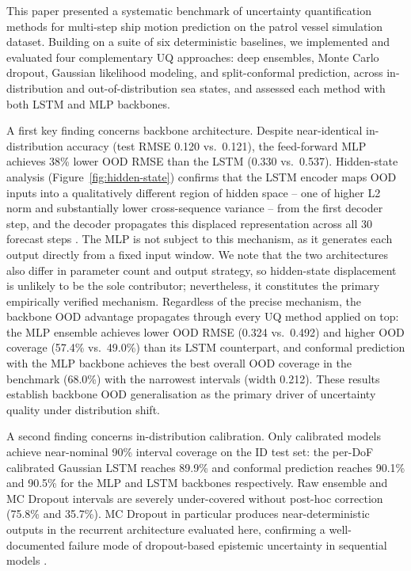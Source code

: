 \documentclass[a4paper,fleqn]{cas-sc}
\begin{document}
This paper presented a systematic benchmark of uncertainty quantification methods for multi-step ship motion prediction on the patrol vessel simulation dataset. Building on a suite of six deterministic baselines, we implemented and evaluated four complementary UQ approaches: deep ensembles, Monte Carlo dropout, Gaussian likelihood modeling, and split-conformal prediction, across in-distribution and out-of-distribution sea states, and assessed each method with both LSTM and MLP backbones.

A first key finding concerns backbone architecture. Despite near-identical in-distribution accuracy (test RMSE 0.120 vs.\ 0.121), the feed-forward MLP achieves 38\% lower OOD RMSE than the LSTM (0.330 vs.\ 0.537). Hidden-state analysis (Figure~\ref{fig:hidden-state}) confirms that the LSTM encoder maps OOD inputs into a qualitatively different region of hidden space -- one of higher L2 norm and substantially lower cross-sequence variance -- from the first decoder step, and the decoder propagates this displaced representation across all 30 forecast steps \cite{quinonero2008dataset}. The MLP is not subject to this mechanism, as it generates each output directly from a fixed input window. We note that the two architectures also differ in parameter count and output strategy, so hidden-state displacement is unlikely to be the sole contributor; nevertheless, it constitutes the primary empirically verified mechanism. Regardless of the precise mechanism, the backbone OOD advantage propagates through every UQ method applied on top: the MLP ensemble achieves lower OOD RMSE (0.324 vs.\ 0.492) and higher OOD coverage (57.4\% vs.\ 49.0\%) than its LSTM counterpart, and conformal prediction with the MLP backbone achieves the best overall OOD coverage in the benchmark (68.0\%) with the narrowest intervals (width 0.212). These results establish backbone OOD generalisation as the primary driver of uncertainty quality under distribution shift.

A second finding concerns in-distribution calibration. Only calibrated models achieve near-nominal 90\% interval coverage on the ID test set: the per-DoF calibrated Gaussian LSTM reaches 89.9\% and conformal prediction reaches 90.1\% and 90.5\% for the MLP and LSTM backbones respectively. Raw ensemble and MC Dropout intervals are severely under-covered without post-hoc correction (75.8\% and 35.7\%). MC Dropout in particular produces near-deterministic outputs in the recurrent architecture evaluated here, confirming a well-documented failure mode of dropout-based epistemic uncertainty in sequential models \cite{gal2016dropout, foldesi2023comparison}.
\end{document}
